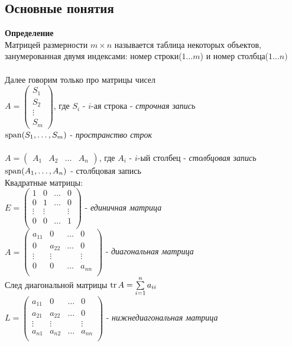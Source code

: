 \documentclass[12pt]{article}
\begin{document}
\subsection{Основные понятия}
\textbf{Определение}\\
Матрицей размерности $m\times n$ называется таблица некоторых объектов, занумерованная двумя индексами: номер строки($1\ldots m$) и номер столбца($1\ldots n)$\\\\
Далее говорим только про матрицы чисел\\
$A = \begin{pmatrix}
S_1\\
S_2\\
\vdots\\
S_m\end{pmatrix}$, где $S_i$ - $i$-ая строка - \textit{строчная запись}\\
$\operatorname{span}(S_1,\ldots,S_m)$ - \textit{пространство строк}\\\\
$A = \begin{pmatrix}A_1 & A_2 & \ldots & A_n\end{pmatrix}$, где $A_i$ - $i$-ый столбец - \textit{столбцовая запись}\\
$\operatorname{span}(A_1,\ldots, A_n)$ - столбцовая запись\\
Квадратные матрицы:\\
$E = \begin{pmatrix}
1 & 0 & \ldots & 0\\
0 & 1 & \ldots & 0\\
\vdots & \vdots &  & \vdots\\
0 & 0 & \ldots & 1\\\end{pmatrix}$ - \textit{единичная матрица}\\
$A = \begin{pmatrix}
a_{11} & 0 & \ldots & 0\\
0 & a_{22} & \ldots & 0\\
\vdots & \vdots &  & \vdots\\
0 & 0 & \ldots & a_{nn}\\\end{pmatrix}$ - \textit{диагональная матрица}\\
След диагональной матрицы $\operatorname{tr} A = \sum\limits_{i=1}^n a_{ii}$\\
$L = \begin{pmatrix}
a_{11} & 0 & \ldots & 0\\
a_{21} & a_{22} & \ldots & 0\\
\vdots & \vdots &  & \vdots\\
a_{n1} & a_{n2} & \ldots & a_{nn}\\\end{pmatrix}$ - \textit{нижнедиагональная матрица}\\
\end{document}
